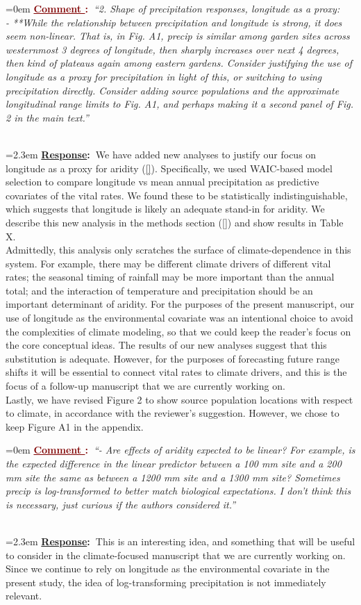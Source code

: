 \documentclass[12pt]{article}
\newcounter{cN}
\newcommand{\comment}[1]{
	\vspace{2em}
	\refstepcounter{cN} %
	\noindent \hangindent=0em \textbf{\textcolor{Maroon}{\uline{Comment \thecN}:~}}\emph{``#1''}
	}
\newcommand{\response}[1]{
	\\[0.25em]
	\hangindent=2.3em \textbf{\textcolor{NavyBlue}{\uline{Response}:~}}#1
	}
\begin{document}
\comment{2. Shape of precipitation responses, longitude as a proxy:
	\\
	- **While the relationship between precipitation and longitude is strong, it does seem non-linear. That is, in Fig. A1, precip is similar among garden sites across westernmost 3 degrees of longitude, then sharply increases over next 4 degrees, then kind of plateaus again among eastern gardens. Consider justifying the use of longitude as a proxy for precipitation in light of this, or switching to using precipitation directly. Consider adding source populations and the approximate longitudinal range limits to Fig. A1, and perhaps making it a second panel of Fig. 2 in the main text.}
\response{We have added new analyses to justify our focus on longitude as a proxy for aridity (\ref{}). Specifically, we used WAIC-based model selection to compare longitude vs mean annual precipitation as predictive covariates of the vital rates. We found these to be statistically indistinguishable, which suggests that longitude is likely an adequate stand-in for aridity. We describe this new analysis in the methods section (\ref{}) and show results in Table X.
\\
Admittedly, this analysis only scratches the surface of climate-dependence in this system. For example, there may be different climate drivers of different vital rates; the seasonal timing of rainfall may be more important than the annual total; and the interaction of temperature and precipitation should be an important determinant of aridity. For the purposes of the present manuscript, our use of longitude as the environmental covariate was an intentional choice to avoid the complexities of climate modeling, so that we could keep the reader's focus on the core conceptual ideas. The results of our new analyses suggest that this substitution is adequate. However, for the purposes of forecasting future range shifts it will be essential to connect vital rates to climate drivers, and this is the focus of a follow-up manuscript that we are currently working on.
\\
Lastly, we have revised Figure 2 to show source population locations with respect to climate, in accordance with the reviewer's suggestion. However, we chose to keep Figure A1 in the appendix.}

\comment{- Are effects of aridity expected to be linear? For example, is the expected difference in the linear predictor between a 100 mm site and a 200 mm site the same as between a 1200 mm site and a 1300 mm site? Sometimes precip is log-transformed to better match biological expectations. I don't think this is necessary, just curious if the authors considered it.}
\response{This is an interesting idea, and something that will be useful to consider in the climate-focused manuscript that we are currently working on. Since we continue to rely on longitude as the environmental covariate in the present study, the idea of log-transforming precipitation is not immediately relevant.}
\end{document}

